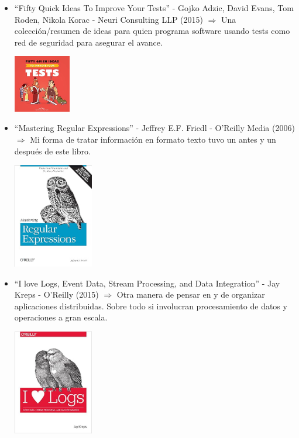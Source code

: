 \documentclass[spanish,12pt,a4paper,final,oneside]{book}
\begin{document}
\begin{itemize}
\item ``Fifty Quick Ideas To Improve Your Tests''  - Gojko Adzic, David Evans, Tom Roden, Nikola Korac - Neuri Consulting LLP (2015) $\Rightarrow$ Una colección/resumen de ideas para quien programa software usando tests como red de seguridad para asegurar el avance.

\includegraphics[width=2.5cm]{portada-FiftyQuickIdeasToImproveYourTests-.jpg} 

\item ``Mastering Regular Expressions'' - Jeffrey E.F. Friedl - O'Reilly Media (2006) $\Rightarrow$ Mi forma de tratar información en formato texto tuvo un antes y un después de este libro.

\includegraphics[width=3.5cm]{portada-MasteringReguarExpressions-JeffreyEFFriedl.jpg} 

\item ``I love Logs, Event Data, Stream Processing, and Data Integration'' - Jay Kreps - O'Reilly (2015) $\Rightarrow$ Otra manera de pensar en y de organizar aplicaciones distribuidas. Sobre todo si involucran procesamiento de datos y operaciones a gran escala.

\includegraphics[width=3.5cm]{portada-IloveLogs-JayKreps.jpg} 

\end{itemize}
\end{document}
